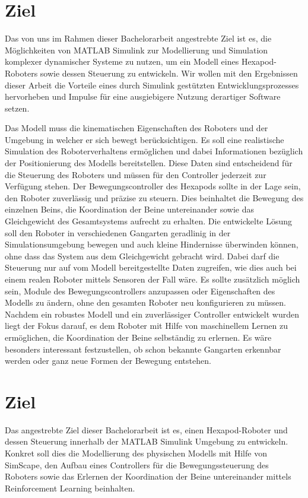 \section{Ziel}
Das von uns im Rahmen dieser Bachelorarbeit angestrebte Ziel ist es, die Möglichkeiten von MATLAB Simulink zur Modellierung und Simulation komplexer dynamischer Systeme zu nutzen, um ein Modell eines Hexapod-Roboters sowie dessen Steuerung zu entwickeln.
Wir wollen mit den Ergebnissen dieser Arbeit die Vorteile eines durch Simulink gestützten Entwicklungsprozesses hervorheben und Impulse für eine ausgiebigere Nutzung derartiger Software setzen.

Das Modell muss die kinematischen Eigenschaften des Roboters und der Umgebung in welcher er sich bewegt berücksichtigen.
Es soll eine realistische Simulation des Roboterverhaltens ermöglichen und dabei Informationen bezüglich der Positionierung des Modells bereitstellen.
Diese Daten sind entscheidend für die Steuerung des Roboters und müssen für den Controller jederzeit zur Verfügung stehen.
Der Bewegungscontroller des Hexapods sollte in der Lage sein, den Roboter zuverlässig und präzise zu steuern.
Dies beinhaltet die Bewegung des einzelnen Beins, die Koordination der Beine untereinander sowie das Gleichgewicht des Gesamtsystems aufrecht zu erhalten.
Die entwickelte Lösung soll den Roboter in verschiedenen Gangarten geradlinig in der Simulationsumgebung bewegen und auch kleine Hindernisse überwinden können, ohne dass das System aus dem Gleichgewicht gebracht wird.
Dabei darf die Steuerung nur auf vom Modell bereitgestellte Daten zugreifen, wie dies auch bei einem realen Roboter mittels Sensoren der Fall wäre.
Es sollte zusätzlich möglich sein, Module des Bewegungscontrollers anzupassen oder Eigenschaften des Modells zu ändern, ohne den gesamten Roboter neu konfigurieren zu müssen.
Nachdem ein robustes Modell und ein zuverlässiger Controller entwickelt wurden liegt der Fokus darauf, es dem Roboter mit Hilfe von maschinellem Lernen zu ermöglichen, die Koordination der Beine selbständig zu erlernen.
Es wäre besonders interessant festzustellen, ob schon bekannte Gangarten erkennbar werden oder ganz neue Formen der Bewegung entstehen.


\section{Ziel}
Das angestrebte Ziel dieser Bachelorarbeit ist es, einen Hexapod-Roboter und dessen Steuerung innerhalb der MATLAB Simulink Umgebung zu entwickeln.
Konkret soll dies die Modellierung des physischen Modells mit Hilfe von SimScape, den Aufbau eines Controllers für die Bewegungssteuerung des Roboters sowie das Erlernen der Koordination der Beine untereinander mittels Reinforcement Learning beinhalten.

